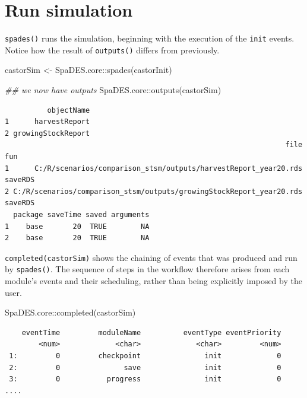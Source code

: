 \documentclass[
  letterpaper,
  DIV=11,
  numbers=noendperiod]{scrreprt}
\newenvironment{Shaded}{\begin{snugshade}}{\end{snugshade}}
\newcommand{\DocumentationTok}[1]{\textcolor[rgb]{0.37,0.37,0.37}{\textit{#1}}}
\newcommand{\FunctionTok}[1]{\textcolor[rgb]{0.28,0.35,0.67}{#1}}
\newcommand{\NormalTok}[1]{\textcolor[rgb]{0.00,0.23,0.31}{#1}}
\newcommand{\OtherTok}[1]{\textcolor[rgb]{0.00,0.23,0.31}{#1}}
\newcommand{\SpecialCharTok}[1]{\textcolor[rgb]{0.37,0.37,0.37}{#1}}
\begin{document}
\section{Run simulation}\label{run-simulation}

\texttt{spades()} runs the simulation, beginning with the execution of
the \texttt{init} events. Notice how the result of \texttt{outputs()}
differs from previously.

\begin{Shaded}
\begin{Highlighting}[]
\NormalTok{castorSim }\OtherTok{\textless{}{-}}\NormalTok{ SpaDES.core}\SpecialCharTok{::}\FunctionTok{spades}\NormalTok{(castorInit)}

\DocumentationTok{\#\# we now have outputs}
\NormalTok{SpaDES.core}\SpecialCharTok{::}\FunctionTok{outputs}\NormalTok{(castorSim)}
\end{Highlighting}
\end{Shaded}

\begin{verbatim}
          objectName
1      harvestReport
2 growingStockReport
                                                                  file     fun
1      C:/R/scenarios/comparison_stsm/outputs/harvestReport_year20.rds saveRDS
2 C:/R/scenarios/comparison_stsm/outputs/growingStockReport_year20.rds saveRDS
  package saveTime saved arguments
1    base       20  TRUE        NA
2    base       20  TRUE        NA
\end{verbatim}

\texttt{completed(castorSim)} shows the chaining of events that was
produced and run by \texttt{spades()}. The sequence of steps in the
workflow therefore arises from each module's events and their
scheduling, rather than being explicitly imposed by the user.

\begin{Shaded}
\begin{Highlighting}[]
\NormalTok{SpaDES.core}\SpecialCharTok{::}\FunctionTok{completed}\NormalTok{(castorSim)}
\end{Highlighting}
\end{Shaded}

\begin{verbatim}
    eventTime         moduleName          eventType eventPriority
        <num>             <char>             <char>         <num>
 1:         0         checkpoint               init             0
 2:         0               save               init             0
 3:         0           progress               init             0
....
\end{verbatim}
\end{document}
